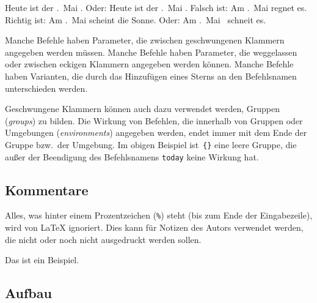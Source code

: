 \begin{LTXexample}[firstline=4]
\renewcommand*\today{%
  \the\numexpr{}\relax.~Mai \the\year}
\obeylines
Heute ist der \today.
Oder: Heute ist der \today .
Falsch ist:
 Am \today regnet es.
Richtig ist:
 Am \today{} scheint die Sonne.
 Oder: Am \today\ schneit es.
\end{LTXexample}
 


Manche Befehle haben Parameter, die zwischen geschwungenen Klammern angegeben 
werden müssen. Manche Befehle haben Parameter, die weggelassen oder zwischen
eckigen Klammern angegeben werden können. Manche Befehle haben Varianten, die 
durch das Hinzufügen eines Sterns an den Befehlsnamen unterschieden werden.

Geschwungene Klammern können auch dazu verwendet werden, Gruppen (\emph{groups})
zu bilden. Die Wirkung von Befehlen, die innerhalb von Gruppen oder Umgebungen 
(\emph{environments}) angegeben werden, endet immer mit dem Ende der Gruppe 
bzw.\ der Umgebung.  Im obigen Beispiel ist~\lstinline|{}| eine leere Gruppe, die 
außer der Beendigung des Befehlsnamens \texttt{today} keine Wirkung hat.
 
\subsection{Kommentare}
 
Alles, was hinter einem Prozentzeichen (\lstinline|%|) steht (bis zum Ende der 
Eingabezeile), wird von \LaTeX{} ignoriert. Dies kann für Notizen des Autors 
verwendet werden, die nicht oder noch nicht ausgedruckt werden sollen.
\begin{LTXexample}
Das ist ein %
Beispiel. 
\end{LTXexample}
 
\subsection{Aufbau}

